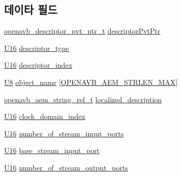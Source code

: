 \subsection*{데이타 필드}
\begin{DoxyCompactItemize}
\item 
\hyperlink{openavb__aem__pub_8h_a85eabab4b7d2466e94c1c3b43b11371d}{openavb\+\_\+descriptor\+\_\+pvt\+\_\+ptr\+\_\+t} \hyperlink{structopenavb__aem__descriptor__audio__unit__t_a302e92fd6cf4d398d5305395359fb157}{descriptor\+Pvt\+Ptr}
\item 
\hyperlink{openavb__types__base__pub_8h_a0a0a322d5fa4a546d293a77ba8b4a71f}{U16} \hyperlink{structopenavb__aem__descriptor__audio__unit__t_a1e231d7874aada5925b29affc76782cc}{descriptor\+\_\+type}
\item 
\hyperlink{openavb__types__base__pub_8h_a0a0a322d5fa4a546d293a77ba8b4a71f}{U16} \hyperlink{structopenavb__aem__descriptor__audio__unit__t_ab26fb363c24b9a2a4391f9171c981b08}{descriptor\+\_\+index}
\item 
\hyperlink{openavb__types__base__pub_8h_aa63ef7b996d5487ce35a5a66601f3e73}{U8} \hyperlink{structopenavb__aem__descriptor__audio__unit__t_a5e98aba8105a7a6d82fac41816c83da3}{object\+\_\+name} \mbox{[}\hyperlink{openavb__aem__types__pub_8h_ab2bb82e9f856a76b8305e4864f23ee58}{O\+P\+E\+N\+A\+V\+B\+\_\+\+A\+E\+M\+\_\+\+S\+T\+R\+L\+E\+N\+\_\+\+M\+AX}\mbox{]}
\item 
\hyperlink{structopenavb__aem__string__ref__t}{openavb\+\_\+aem\+\_\+string\+\_\+ref\+\_\+t} \hyperlink{structopenavb__aem__descriptor__audio__unit__t_afd613361c59409fb6dcc0c237d1cfbfd}{localized\+\_\+description}
\item 
\hyperlink{openavb__types__base__pub_8h_a0a0a322d5fa4a546d293a77ba8b4a71f}{U16} \hyperlink{structopenavb__aem__descriptor__audio__unit__t_a6bf82a91e71555466bdcba713002b1ff}{clock\+\_\+domain\+\_\+index}
\item 
\hyperlink{openavb__types__base__pub_8h_a0a0a322d5fa4a546d293a77ba8b4a71f}{U16} \hyperlink{structopenavb__aem__descriptor__audio__unit__t_a96b944158688a4991f94f8e95558a744}{number\+\_\+of\+\_\+stream\+\_\+input\+\_\+ports}
\item 
\hyperlink{openavb__types__base__pub_8h_a0a0a322d5fa4a546d293a77ba8b4a71f}{U16} \hyperlink{structopenavb__aem__descriptor__audio__unit__t_abe079f27d2ddf72530221b42fcb9ea79}{base\+\_\+stream\+\_\+input\+\_\+port}
\item 
\hyperlink{openavb__types__base__pub_8h_a0a0a322d5fa4a546d293a77ba8b4a71f}{U16} \hyperlink{structopenavb__aem__descriptor__audio__unit__t_a4a61d0b1fa356cae2a9fdd3eda899be1}{number\+\_\+of\+\_\+stream\+\_\+output\+\_\+ports}

\end{DoxyCompactItemize}
